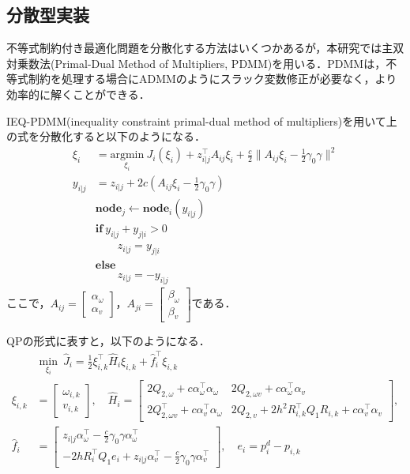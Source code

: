 \subsection{分散型実装}

不等式制約付き最適化問題を分散化する方法はいくつかあるが，本研究では主双対乗数法(Primal-Dual Method of Multipliers, PDMM)を用いる．PDMMは，不等式制約を処理する場合にADMMのようにスラック変数修正が必要なく，より効率的に解くことができる\cite{Zhang2024}．

IEQ-PDMM(inequality constraint primal-dual method of multipliers)を用いて上の式を分散化すると以下のようになる．
\begin{equation}
\begin{aligned}
\xi_i &= \underset{\xi_i}{\mathrm{argmin}} \:J_i(\xi_i)+z_{i|j}^\top A_{ij}\xi_i+\frac{c}{2}\|A_{ij}\xi_i-\frac{1}{2}\gamma_0\gamma\|^2 \\
y_{i|j} &= z_{i|j}+2c(A_{ij}\xi_{i}-\frac{1}{2}\gamma_0\gamma) \\
&\mathbf{node}_j\leftarrow \mathbf{node}_i(y_{i|j}) \\
&\mathbf{if}\:y_{i|j}+y_{j|i}>0 \\
&\qquad z_{i|j}=y_{j|i} \\
&\mathbf{else}\: \\
&\qquad z_{i|j}=-y_{i|j}
\label{eq:pdmm}
\end{aligned}
\end{equation}
ここで，$A_{ij} = \begin{bmatrix} \alpha_\omega \\ \alpha_v \end{bmatrix}$，$A_{ji} = \begin{bmatrix} \beta_\omega \\ \beta_v \end{bmatrix}$である．

QPの形式に表すと，以下のようになる．
\begin{equation}
\begin{aligned}
&\min_{\xi_i}\:\hat{J}_i = \frac{1}{2}\xi_{i,k}^\top \hat{H}_i\xi_{i,k} + \hat{f}_i^\top \xi_{i,k} \\
\xi_{i,k} &= \begin{bmatrix}
\omega_{i,k}\\v_{i,k}
\end{bmatrix}, \quad
\hat{H}_i = \begin{bmatrix}
2Q_{2,\omega}+c\alpha_\omega^\top \alpha_\omega & 2Q_{2,\omega v}+c\alpha_\omega^\top \alpha_v \\
2Q^\top_{2,\omega v}+c\alpha_v^\top \alpha_\omega & 2Q_{2,v}+2h^2R_{i,k}^\top Q_1R_{i,k}+c\alpha_v^\top \alpha_v
\end{bmatrix}, \\
\hat{f}_i &= \begin{bmatrix}
z_{i|j}\alpha_\omega^\top -\frac{c}{2}\gamma_0\gamma\alpha_\omega^\top \\
-2hR_i^\top Q_1 e_i+z_{i|j}\alpha_v^\top -\frac{c}{2}\gamma_0\gamma\alpha_v^\top
\end{bmatrix}, \quad e_i = p^d_{i}-p_{i,k}
\label{eq:pdmm_qp}
\end{aligned}
\end{equation}

